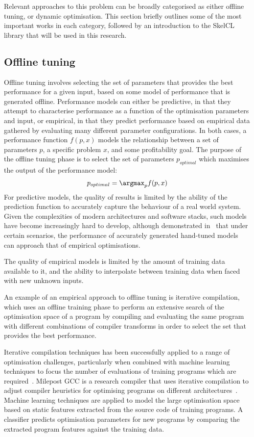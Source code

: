 Relevant approaches to this problem can be broadly categorised as
either offline tuning, or dynamic optimisation. This section briefly
outlines some of the most important works in each category, followed
by an introduction to the SkelCL library that will be used in this
research.

\subsection{Offline tuning}\label{subsec:offline-tuning}
Offline tuning involves selecting the set of parameters that provides
the best performance for a given input, based on some model of
performance that is generated offline. Performance models can either
be predictive, in that they attempt to characterise performance as a
function of the optimisation parameters and input, or empirical, in
that they predict performance based on empirical data gathered by
evaluating many different parameter configurations. In both cases, a
performance function $f(p,x)$ models the relationship between a set of
parameters $p$, a specific problem $x$, and some profitability
goal. The purpose of the offline tuning phase is to select the set of
parameters $p_{optimal}$ which maximises the output of the performance
model:
\begin{align*}
  p_{optimal} = \argmax_{p}f(p,x)
\end{align*}
For predictive models, the quality of results is limited by the
ability of the prediction function to accurately capture the behaviour
of a real world system. Given the complexities of modern architectures
and software stacks, such models have become increasingly hard to
develop, although \citeauthor{Yotov2003} demonstrated
in~\cite{Yotov2003} that under certain scenarios, the performance of
accurately generated hand-tuned models can approach that of empirical
optimisations.

The quality of empirical models is limited by the amount of training
data available to it, and the ability to interpolate between training
data when faced with new unknown inputs.

An example of an empirical approach to offline tuning is iterative
compilation, which uses an offline training phase to perform an
extensive search of the optimisation space of a program by compiling
and evaluating the same program with different combinations of
compiler transforms in order to select the set that provides the best
performance.

Iterative compilation techniques has been successfully applied to a
range of optimisation challenges, particularly when combined with
machine learning techniques to focus the number of evaluations of
training programs which are required~\cite{Agakov}. Milepost GCC is a
research compiler that uses iterative compilation to adjust compiler
heuristics for optimising programs on different
architectures~\cite{Fursin2011}. Machine learning techniques are
applied to model the large optimisation space based on static features
extracted from the source code of training programs. A classifier
predicts optimisation parameters for new programs by comparing the
extracted program features against the training data.

